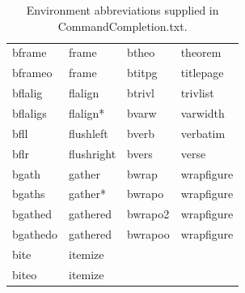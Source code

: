 \documentclass[11pt]{article}
\newcommand{\CCT}{\textsf{CommandCompletion.txt}}
\begin{document}
\begin{table}
\begin{tabular}{llll}
bframe    & frame       & btheo   & theorem \\
bframeo   & frame       & btitpg  & titlepage \\
bflalig   & flalign     & btrivl  & trivlist \\
bflaligs  & flalign*    & bvarw   & varwidth \\
bfll      & flushleft   & bverb   & verbatim \\
bflr      & flushright  & bvers   & verse \\
bgath     & gather      & bwrap   & wrapfigure \\
bgaths    & gather*     & bwrapo  & wrapfigure \\
bgathed   & gathered    & bwrapo2 & wrapfigure \\
bgathedo  & gathered    & bwrapoo & wrapfigure \\
bite      & itemize     &         & \\
biteo     & itemize     &         & \\
\end{tabular}
\caption{Environment abbreviations supplied in \CCT.}
\label{tbl:environments}
\end{table}
\end{document}
